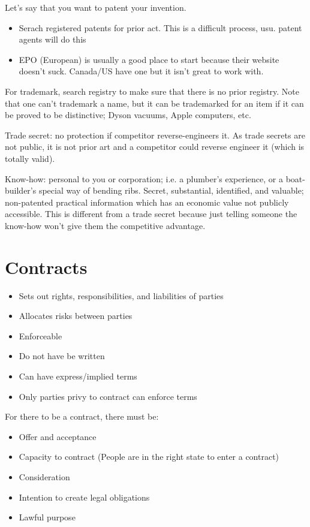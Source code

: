 \documentclass[10pt]{article}
\begin{document}
Let's say that you want to patent your invention.

\begin{itemize}
	\item Serach registered patents for prior act. This is a difficult process, usu. patent agents will do this
	\item EPO (European) is usually a good place to start because their website doesn't suck. Canada/US have one but it isn't great to work with.
\end{itemize}

For trademark, search registry to make sure that there is no prior registry.
Note that one can't trademark a name, but it can be trademarked for an item if it can be proved to be distinctive; Dyson vacuums, Apple computers, etc.


Trade secret: no protection if competitor reverse-engineers it. 
As trade secrets are not public, it is not prior art and a competitor could reverse engineer it (which is totally valid).


Know-how: personal to you or corporation; i.e. a plumber's experience, or a boat-builder's special way of bending ribs. Secret, substantial, identified, and valuable; non-patented practical information which has an economic value not publicly accessible.
This is different from a trade secret because just telling someone the know-how won't give them the competitive advantage.


\section{Contracts}


\begin{itemize}
	\item Sets out rights, responsibilities, and liabilities of parties
	\item Allocates risks between parties
	\item Enforceable
	\item Do not have be written
	\item Can have express/implied terms
	\item Only parties privy to contract can enforce terms	
\end{itemize}

For there to be a contract, there must be:

\begin{itemize}
	\item Offer and acceptance
	\item Capacity to contract (People are in the right state to enter a contract)
	\item Consideration
	\item Intention to create legal obligations
	\item Lawful purpose
\end{itemize}
\end{document}
